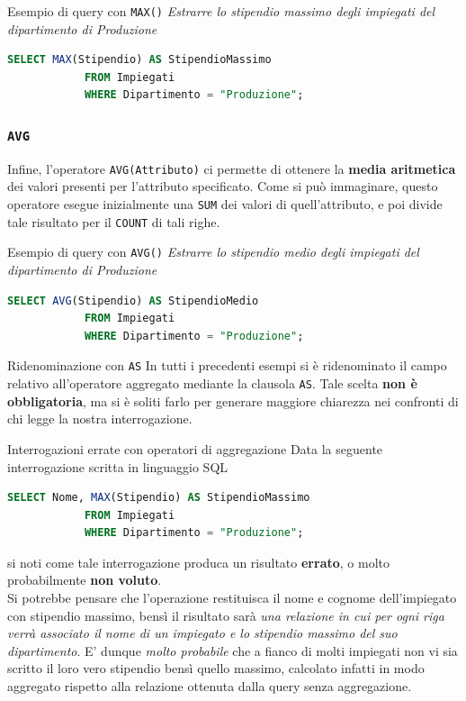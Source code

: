 \documentclass[12pt]{report}
\begin{document}
	\begin{esempio}{Esempio di query con \texttt{MAX()}}{}
		\textit{Estrarre lo stipendio massimo degli impiegati del dipartimento di Produzione}
		\begin{lstlisting}[language=SQL]
			SELECT MAX(Stipendio) AS StipendioMassimo
			FROM Impiegati
			WHERE Dipartimento = "Produzione";
		\end{lstlisting}
	\end{esempio}
	
	\subsubsection*{\texttt{AVG}}
	Infine, l'operatore \texttt{AVG(Attributo)} ci permette di ottenere la \textbf{media aritmetica} dei valori presenti per l'attributo specificato. Come si può immaginare, questo operatore esegue inizialmente una \texttt{SUM} dei valori di quell'attributo, e poi divide tale risultato per il \texttt{COUNT} di tali righe.
	
	\begin{esempio}{Esempio di query con \texttt{AVG()}}{}
		\textit{Estrarre lo stipendio medio degli impiegati del dipartimento di Produzione}
		\begin{lstlisting}[language=SQL]
			SELECT AVG(Stipendio) AS StipendioMedio
			FROM Impiegati
			WHERE Dipartimento = "Produzione";
		\end{lstlisting}
	\end{esempio}
	
	\begin{osservazione}{Ridenominazione con \texttt{AS}}{}
		In tutti i precedenti esempi si è ridenominato il campo relativo all'operatore aggregato mediante la clausola \texttt{AS}. Tale scelta \textbf{non è obbligatoria}, ma si è soliti farlo per generare maggiore chiarezza nei confronti di chi legge la nostra interrogazione.
	\end{osservazione}
	
	\begin{osservazione}{Interrogazioni errate con operatori di aggregazione}{}
		Data la seguente interrogazione scritta in linguaggio SQL
		\begin{lstlisting}[language=SQL]
			SELECT Nome, MAX(Stipendio) AS StipendioMassimo
			FROM Impiegati
			WHERE Dipartimento = "Produzione";
		\end{lstlisting}
		si noti come tale interrogazione produca un risultato \textbf{errato}, o molto probabilmente \textbf{non voluto}.\\
		Si potrebbe pensare che l'operazione restituisca il nome e cognome dell'impiegato con stipendio massimo, bensì il risultato sarà \textit{una relazione in cui per ogni riga verrà associato il nome di un impiegato e lo stipendio massimo del suo dipartimento}. E' dunque \textit{molto probabile} che a fianco di molti impiegati non vi sia scritto il loro vero stipendio bensì quello massimo, calcolato infatti in modo aggregato rispetto alla relazione ottenuta dalla query senza aggregazione.
	\end{osservazione}
	
\end{document}
